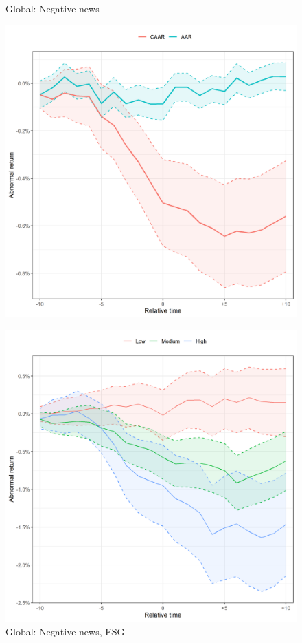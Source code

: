 \begin{figure}
     \centering
     \begin{minipage}[b]{0.49\textwidth}
         \centering
    \caption{Global: Negative news}
    \includegraphics[width=\textwidth]{Projekt/1.Figures analysis/ST_negative_all_CI_nasdaq.png}
     \label{fig:ST_neg_sensitivity_nasdaq}
     \end{minipage}
     \hfill
     \begin{minipage}[b]{0.49\textwidth}
       \centering
    \caption{Global: Negative news, ESG}
    \includegraphics[width=\textwidth]{Projekt/1.Figures analysis/ST_negative_ESG_nasdaq.png}

\end{minipage}
\end{figure}
